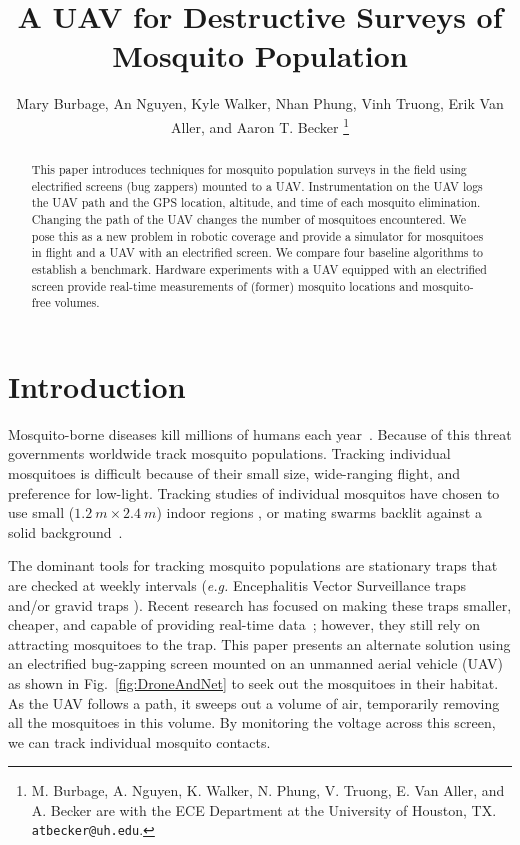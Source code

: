 \documentclass[letterpaper, 10 pt, conference]{ieeeconf}  %
\title{\LARGE \bf
A UAV for Destructive Surveys of Mosquito Population
}
\author{Mary Burbage, An Nguyen, Kyle Walker, Nhan Phung, Vinh Truong, Erik Van Aller, and Aaron T. Becker%
\thanks{M. Burbage, A. Nguyen, K. Walker, N. Phung, V. Truong, E. Van Aller, and A. Becker are with the ECE Department at the University of Houston, TX.
        {\tt\small atbecker@uh.edu}.}%
}
\begin{document}
\maketitle
\thispagestyle{empty}
\pagestyle{empty}


\begin{abstract}
This paper introduces techniques for mosquito population surveys in the field using electrified screens (bug zappers) mounted to a UAV. Instrumentation on the UAV logs the UAV path and the GPS location, altitude, and time of each mosquito elimination. Changing the path of the UAV changes the number of mosquitoes encountered.  We pose this as a new problem in robotic coverage and provide a simulator for
mosquitoes in flight and a UAV with an electrified screen. We compare four baseline algorithms to establish a benchmark. 
Hardware experiments with a UAV equipped with an electrified screen provide real-time measurements of (former) mosquito locations and mosquito-free volumes.
\end{abstract}




\section{Introduction}

Mosquito-borne diseases kill millions of humans each year~\cite{murray2012global}. 
 Because of this threat governments worldwide track mosquito populations.
 Tracking individual mosquitoes is difficult because of their small size, wide-ranging flight, and preference for low-light.
 Tracking studies of individual mosquitos have chosen to use small ($1.2~m \times 2.4~m$) indoor regions \cite{parker2015infrared}, or mating swarms backlit against a solid background~\cite{butail20113d}.

The dominant tools for tracking mosquito populations are stationary traps that are checked at weekly intervals (\textit{e.g.} Encephalitis Vector Surveillance traps and/or gravid traps \cite{williams2007comparison}). 
Recent research has focused on making these traps smaller, cheaper, and capable of providing real-time data~\cite{chen2014flying,linn2016building}; however, they still rely on attracting mosquitoes to the trap. 
 This paper presents an alternate solution using an electrified bug-zapping screen mounted on an unmanned aerial vehicle (UAV) as shown in Fig.~\ref{fig:DroneAndNet} to seek out the mosquitoes in their habitat.  As the UAV follows a path, it sweeps out a volume of air, temporarily removing all the mosquitoes in this volume.  By monitoring the voltage across this screen, we can track individual mosquito contacts.
 
\end{document}
